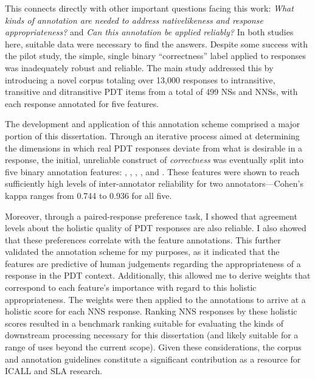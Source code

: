 This connects directly with other important questions facing this work: \textit{What kinds of annotation are needed to address nativelikeness and response appropriateness?} and \textit{Can this annotation be applied reliably?}
In both studies here, suitable data were necessary to find the answers. Despite some success with the pilot study, the simple, single binary ``correctness'' label applied to responses was inadequately robust and reliable. The main study addressed this by introducing a novel corpus totaling over 13,000 responses to intransitive, transitive and ditransitive PDT items from a total of 499 NSs and NNSs, with each response annotated for five features.

The development and application of this annotation scheme comprised a major portion of this dissertation. Through an iterative process aimed at determining the dimensions in which real PDT responses deviate from what is desirable in a response, the initial, unreliable construct of \textit{correctness} was eventually split into five binary annotation features: , , , , and . These features were shown to reach sufficiently high levels of inter-annotator reliability for two annotators---Cohen's kappa ranges from 0.744 to 0.936 for all five.

Moreover, through a paired-response preference task, I showed that agreement levels about the holistic quality of PDT responses are also reliable. I also showed that these preferences correlate with the feature annotations. This further validated the annotation scheme for my purposes, as it indicated that the features are predictive of human judgements regarding the appropriateness of a response in the PDT context. Additionally, this allowed me to derive weights that correspond to each feature's importance with regard to this holistic appropriateness. The weights were then applied to the annotations to arrive at a holistic score for each NNS response. Ranking NNS responses by these holistic scores resulted in a benchmark ranking suitable for evaluating the kinds of downstream processing necessary for this dissertation (and likely suitable for a range of uses beyond the current scope).
Given these considerations, the corpus and annotation guidelines constitute a significant contribution as a resource for ICALL and SLA research.

